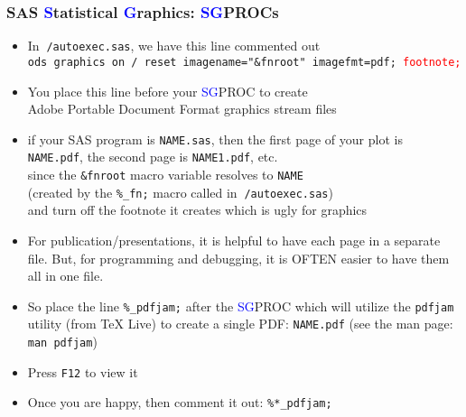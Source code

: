 \documentclass[11pt,pdftex,dvipsnames,usenames,helvetica]{beamer}
\begin{document}
\begin{frame}[fragile]
\frametitle{SAS \textcolor{blue}{S}tatistical \textcolor{blue}{G}raphics:
\textcolor{blue}{SG}PROCs }
\begin{itemize}
\item In {\tt $~$/autoexec.sas}, we have this line commented out\\
{\tt ods graphics on / reset imagename="\&fnroot" imagefmt=pdf;
\textcolor{red}{footnote;}}
\item You place this line before your \textcolor{blue}{SG}PROC
to create\\ Adobe Portable Document Format graphics stream files
\item if your SAS program is {\tt NAME.sas}, then the first page of
your plot is {\tt NAME.pdf}, the second page is {\tt NAME1.pdf}, etc.\\
since the {\tt \&fnroot} macro variable resolves to {\tt NAME}\\
(created by the {\tt \%\_fn;} macro called in {\tt $~$/autoexec.sas})\\
and turn off the footnote it creates which is ugly for graphics
\item For publication/presentations, it is helpful to have each page
  in a separate file.  But, for programming and debugging, it is OFTEN
  easier to have them all in one file.
\item So place the line {\tt \%\_pdfjam;} after the \textcolor{blue}{SG}PROC
which will utilize the {\tt pdfjam} utility (from TeX Live) to create
a single PDF: {\tt NAME.pdf} (see the man page: {\tt man pdfjam})
\item Press {\tt F12} to view it
\item Once you are happy, then comment it out: {\tt \%*\_pdfjam;}
\end{itemize}
\end{frame}
\end{document}

